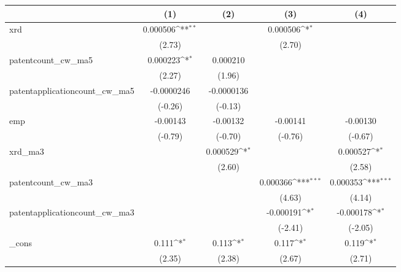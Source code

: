 {
\def\sym#1{\ifmmode^{#1}\else\(^{#1}\)\fi}
\begin{tabular}{l*{4}{c}}
\hline\hline
            &\multicolumn{1}{c}{(1)}         &\multicolumn{1}{c}{(2)}         &\multicolumn{1}{c}{(3)}         &\multicolumn{1}{c}{(4)}         \\
\hline
xrd         &    0.000506\sym{**} &                     &    0.000506\sym{*}  &                     \\
            &      (2.73)         &                     &      (2.70)         &                     \\
[1em]
patentcount\_cw\_ma5&    0.000223\sym{*}  &    0.000210         &                     &                     \\
            &      (2.27)         &      (1.96)         &                     &                     \\
[1em]
patentapplicationcount\_cw\_ma5&  -0.0000246         &  -0.0000136         &                     &                     \\
            &     (-0.26)         &     (-0.13)         &                     &                     \\
[1em]
emp         &    -0.00143         &    -0.00132         &    -0.00141         &    -0.00130         \\
            &     (-0.79)         &     (-0.70)         &     (-0.76)         &     (-0.67)         \\
[1em]
xrd\_ma3     &                     &    0.000529\sym{*}  &                     &    0.000527\sym{*}  \\
            &                     &      (2.60)         &                     &      (2.58)         \\
[1em]
patentcount\_cw\_ma3&                     &                     &    0.000366\sym{***}&    0.000353\sym{***}\\
            &                     &                     &      (4.63)         &      (4.14)         \\
[1em]
patentapplicationcount\_cw\_ma3&                     &                     &   -0.000191\sym{*}  &   -0.000178\sym{*}  \\
            &                     &                     &     (-2.41)         &     (-2.05)         \\
[1em]
\_cons      &       0.111\sym{*}  &       0.113\sym{*}  &       0.117\sym{*}  &       0.119\sym{*}  \\
            &      (2.35)         &      (2.38)         &      (2.67)         &      (2.71)         \\

\end{tabular}}
